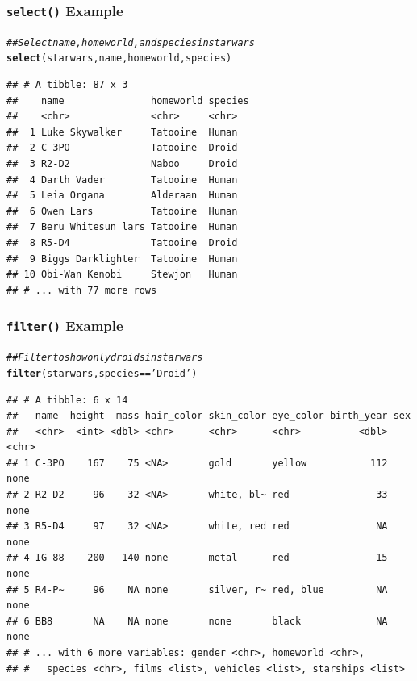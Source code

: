 \documentclass{beamer}\usepackage[]{graphicx}\usepackage[]{color}
\makeatletter
\newcommand{\hlstr}[1]{\textcolor[rgb]{0.192,0.494,0.8}{#1}}%
\newcommand{\hlcom}[1]{\textcolor[rgb]{0.678,0.584,0.686}{\textit{#1}}}%
\newcommand{\hlopt}[1]{\textcolor[rgb]{0,0,0}{#1}}%
\newcommand{\hlstd}[1]{\textcolor[rgb]{0.345,0.345,0.345}{#1}}%
\newcommand{\hlkwd}[1]{\textcolor[rgb]{0.737,0.353,0.396}{\textbf{#1}}}%
\newenvironment{kframe}{%
 \def\at@end@of@kframe{}%
 \ifinner\ifhmode%
  \def\at@end@of@kframe{\end{minipage}}%
  \begin{minipage}{\columnwidth}%
 \fi\fi%
 \def\FrameCommand##1{\hskip\@totalleftmargin \hskip-\fboxsep
 \colorbox{shadecolor}{##1}\hskip-\fboxsep
     \hskip-\linewidth \hskip-\@totalleftmargin \hskip\columnwidth}%
 \MakeFramed {\advance\hsize-\width
   \@totalleftmargin\z@ \linewidth\hsize
   \@setminipage}}%
 {\par\unskip\endMakeFramed%
 \at@end@of@kframe}
\newenvironment{knitrout}{}{} %
\makeatother
\begin{document}
\begin{frame}[fragile]\frametitle{\texttt{select()} Example}
\begin{knitrout}\footnotesize
{}\color{fgcolor}\begin{kframe}
\begin{alltt}
\hlcom{## Select name, homeworld, and species in starwars}
\hlkwd{select}\hlstd{(starwars, name, homeworld, species)}
\end{alltt}
\begin{verbatim}
## # A tibble: 87 x 3
##    name               homeworld species
##    <chr>              <chr>     <chr>  
##  1 Luke Skywalker     Tatooine  Human  
##  2 C-3PO              Tatooine  Droid  
##  3 R2-D2              Naboo     Droid  
##  4 Darth Vader        Tatooine  Human  
##  5 Leia Organa        Alderaan  Human  
##  6 Owen Lars          Tatooine  Human  
##  7 Beru Whitesun lars Tatooine  Human  
##  8 R5-D4              Tatooine  Droid  
##  9 Biggs Darklighter  Tatooine  Human  
## 10 Obi-Wan Kenobi     Stewjon   Human  
## # ... with 77 more rows
\end{verbatim}
\end{kframe}
\end{knitrout}
\end{frame}

\begin{frame}[fragile]\frametitle{\texttt{filter()} Example}
\begin{knitrout}\footnotesize
{}\color{fgcolor}\begin{kframe}
\begin{alltt}
\hlcom{## Filter to show only droids in starwars}
\hlkwd{filter}\hlstd{(starwars, species} \hlopt{==} \hlstr{'Droid'}\hlstd{)}
\end{alltt}
\begin{verbatim}
## # A tibble: 6 x 14
##   name  height  mass hair_color skin_color eye_color birth_year sex  
##   <chr>  <int> <dbl> <chr>      <chr>      <chr>          <dbl> <chr>
## 1 C-3PO    167    75 <NA>       gold       yellow           112 none 
## 2 R2-D2     96    32 <NA>       white, bl~ red               33 none 
## 3 R5-D4     97    32 <NA>       white, red red               NA none 
## 4 IG-88    200   140 none       metal      red               15 none 
## 5 R4-P~     96    NA none       silver, r~ red, blue         NA none 
## 6 BB8       NA    NA none       none       black             NA none 
## # ... with 6 more variables: gender <chr>, homeworld <chr>,
## #   species <chr>, films <list>, vehicles <list>, starships <list>
\end{verbatim}
\end{kframe}
\end{knitrout}
\end{frame}
\end{document}
